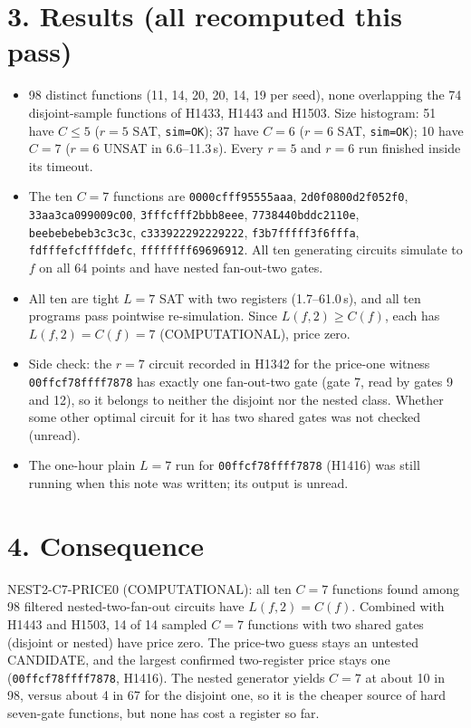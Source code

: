 \documentclass[11pt]{article}
\begin{document}
\section*{3. Results (all recomputed this pass)}
\begin{itemize}
\item 98 distinct functions (11, 14, 20, 20, 14, 19 per seed), none overlapping the 74 disjoint-sample functions of H1433, H1443 and H1503. Size histogram: 51 have $C\le5$ ($r=5$ SAT, \texttt{sim=OK}); 37 have $C=6$ ($r=6$ SAT, \texttt{sim=OK}); 10 have $C=7$ ($r=6$ UNSAT in 6.6--11.3\,s). Every $r=5$ and $r=6$ run finished inside its timeout.
\item The ten $C=7$ functions are \texttt{0000cfff95555aaa}, \texttt{2d0f0800d2f052f0}, \texttt{33aa3ca099009c00}, \texttt{3fffcfff2bbb8eee}, \texttt{7738440bddc2110e}, \texttt{beebebebeb3c3c3c}, \texttt{c333922292229222}, \texttt{f3b7fffff3f6fffa}, \texttt{fdfffefcffffdefc}, \texttt{ffffffff69696912}. All ten generating circuits simulate to $f$ on all 64 points and have nested fan-out-two gates.
\item All ten are tight $L=7$ SAT with two registers (1.7--61.0\,s), and all ten programs pass pointwise re-simulation. Since $L(f,2)\ge C(f)$, each has $L(f,2)=C(f)=7$ (COMPUTATIONAL), price zero.
\item Side check: the $r=7$ circuit recorded in H1342 for the price-one witness \texttt{00ffcf78ffff7878} has exactly one fan-out-two gate (gate 7, read by gates 9 and 12), so it belongs to neither the disjoint nor the nested class. Whether some other optimal circuit for it has two shared gates was not checked (unread).
\item The one-hour plain $L=7$ run for \texttt{00ffcf78ffff7878} (H1416) was still running when this note was written; its output is unread.
\end{itemize}

\section*{4. Consequence}
NEST2-C7-PRICE0 (COMPUTATIONAL): all ten $C=7$ functions found among 98 filtered nested-two-fan-out circuits have $L(f,2)=C(f)$. Combined with H1443 and H1503, 14 of 14 sampled $C=7$ functions with two shared gates (disjoint or nested) have price zero. The price-two guess stays an untested CANDIDATE, and the largest confirmed two-register price stays one (\texttt{00ffcf78ffff7878}, H1416). The nested generator yields $C=7$ at about 10 in 98, versus about 4 in 67 for the disjoint one, so it is the cheaper source of hard seven-gate functions, but none has cost a register so far.
\end{document}
